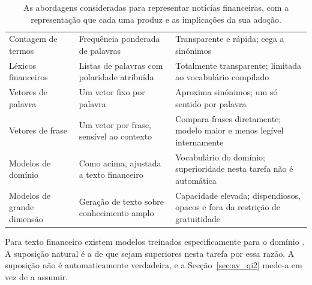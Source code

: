 \begin{table}[!htbp]
\caption[Abordagens de representação de texto]{As abordagens consideradas para representar notícias
financeiras, com a representação que cada uma produz e as implicações da sua adoção.}
\label{tab:ctx_texto}
\centering
\small
\begin{tabular}{L{0.22\textwidth} L{0.28\textwidth} L{0.36\textwidth}}
\toprule
{} &  &  \\
\midrule
Contagem de termos \newline \autocite{salton1975vsm, robertson2009bm25}
  & Frequência ponderada de palavras
  & Transparente e rápida; cega a sinónimos \\
\addlinespace
Léxicos financeiros \newline \autocite{loughran2011liability}
  & Listas de palavras com polaridade atribuída
  & Totalmente transparente; limitada ao vocabulário compilado \\
\addlinespace
Vetores de palavra \newline \autocite{mikolov2013word2vec, pennington2014glove}
  & Um vetor fixo por palavra
  & Aproxima sinónimos; um só sentido por palavra \\
\addlinespace
Vetores de frase \newline \autocite{devlin2019bert, reimers2019sbert}
  & Um vetor por frase, sensível ao contexto
  & Compara frases diretamente; modelo maior e menos legível internamente \\
\addlinespace
Modelos de domínio \newline \autocite{liu2020finbert, huang2023finbert}
  & Como acima, ajustada a texto financeiro
  & Vocabulário do domínio; superioridade nesta tarefa não é automática \\
\addlinespace
Modelos de grande dimensão \newline \autocite{li2023llmfinance}
  & Geração de texto sobre conhecimento amplo
  & Capacidade elevada; dispendiosos, opacos e fora da restrição de gratuitidade \\
\bottomrule
\end{tabular}
\end{table}

Para texto financeiro existem modelos treinados especificamente para o domínio
\autocite{liu2020finbert, huang2023finbert}. A suposição natural
é a de que sejam superiores nesta tarefa por essa razão. A suposição não é automaticamente
verdadeira, e a Secção~\ref{sec:av_qi2} mede-a em vez de a assumir.

